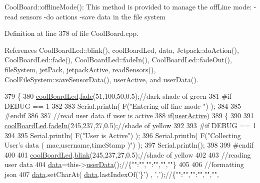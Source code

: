 Cool\+Board\+::offline\+Mode()\+: This method is provided to manage the off\+Line mode\+: -\/read sensors -\/do actions -\/save data in the file system 

Definition at line 378 of file Cool\+Board.\+cpp.



References Cool\+Board\+Led\+::blink(), cool\+Board\+Led, data, Jetpack\+::do\+Action(), Cool\+Board\+Led\+::fade(), Cool\+Board\+Led\+::fade\+In(), Cool\+Board\+Led\+::fade\+Out(), file\+System, jet\+Pack, jetpack\+Active, read\+Sensors(), Cool\+File\+System\+::save\+Sensor\+Data(), user\+Active, and user\+Data().


\begin{DoxyCode}
379 \{
380     \hyperlink{classCoolBoard_a1b1d3c684a5baa56b08486e192fd8e97}{coolBoardLed}.\hyperlink{classCoolBoardLed_af1cacbaa88db8bcf6042c1083ba41155}{fade}(51,100,50,0.5);\textcolor{comment}{//dark shade of green  }
381 \textcolor{preprocessor}{#if DEBUG == 1  }
382     
383     Serial.println( F(\textcolor{stringliteral}{"Entering off line mode "}) ); 
384     
385 \textcolor{preprocessor}{#endif}
386 
387     \textcolor{comment}{//read user data if user is active}
388     \textcolor{keywordflow}{if}(\hyperlink{classCoolBoard_a6395459131d6889a3005f79c7a35e964}{userActive})
389     \{
390 
391         \hyperlink{classCoolBoard_a1b1d3c684a5baa56b08486e192fd8e97}{coolBoardLed}.\hyperlink{classCoolBoardLed_ab778f5e7bed0ab74e3906d82110493c3}{fadeIn}(245,237,27,0.5);\textcolor{comment}{//shade of yellow}
392 
393 \textcolor{preprocessor}{    #if DEBUG == 1}
394         
395         Serial.println( F(\textcolor{stringliteral}{"User is Active"}) );
396         Serial.println( F(\textcolor{stringliteral}{"Collecting User's data ( mac,username,timeStamp )"}) );
397         Serial.println();
398 
399 \textcolor{preprocessor}{    #endif}
400 
401         \hyperlink{classCoolBoard_a1b1d3c684a5baa56b08486e192fd8e97}{coolBoardLed}.\hyperlink{classCoolBoardLed_a96e1ea13003eee34c9dbcef340404426}{blink}(245,237,27,0.5);\textcolor{comment}{//shade of yellow   }
402 
403         \textcolor{comment}{//reading user data}
404         \hyperlink{classCoolBoard_a427fb753dd8575bdf821c70a5c63d695}{data}=this->\hyperlink{classCoolBoard_ae7358fb6e623cfc81b775f5f1734909b}{userData}();\textcolor{comment}{//\{"":"","":"","",""\}}
405 
406         \textcolor{comment}{//formatting json }
407         \hyperlink{classCoolBoard_a427fb753dd8575bdf821c70a5c63d695}{data}.setCharAt( \hyperlink{classCoolBoard_a427fb753dd8575bdf821c70a5c63d695}{data}.lastIndexOf(\textcolor{charliteral}{'\}'}) , \textcolor{charliteral}{','});\textcolor{comment}{//\{"":"","":"","","",}

\end{DoxyCode}
